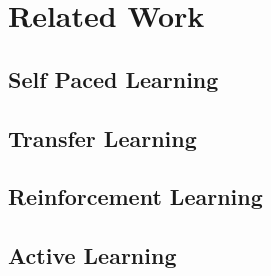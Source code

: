 \chapter{Related Work}\label{Related Work}

\section{Self Paced Learning}

\section{Transfer Learning}

\section{Reinforcement Learning}

\section{Active Learning}